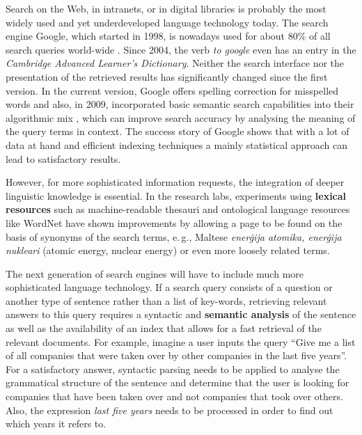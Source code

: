 \begin{multicols}{2}
Search on the Web, in intranets, or in digital libraries is probably the most widely used and yet underdeveloped language technology today. The search engine Google, which started in 1998, is nowadays used for about 80\% of all search queries world-wide \cite{spi1}. Since 2004, the verb \emph{to google} even has an entry in the \emph{Cambridge Advanced Learner’s Dictionary}. Neither the search interface nor the presentation of the retrieved results has significantly changed since the first version. 
In the current version, Google offers spelling correction for misspelled words and also, in 2009, incorporated basic semantic search capabilities into their algorithmic mix \cite{pc1}, which can improve search accuracy by analysing the meaning of the query terms in context. The success story of Google shows that with a lot of data at hand and efficient indexing techniques a mainly statistical approach can lead to satisfactory results.  

However, for more sophisticated information requests, the integration of deeper linguistic knowledge is essential. In the research labs, experiments using \textbf{lexical resources} such as machine-readable thesauri and ontological language resources like WordNet have shown improvements by allowing a page to be found on the basis of synonyms of the search terms, e.\,g., Maltese \emph{enerġija atomika, enerġija nukleari} (atomic energy, nuclear energy) or even more loosely related terms.


The next generation of search engines will have to include much more sophisticated language technology. If a search query consists of a question or another type of sentence rather than a list of key-words, retrieving relevant answers to this query requires a syntactic and \textbf{semantic analysis} of the sentence as well as the availability of an index that allows for a fast retrieval of the relevant documents. For example, imagine a user inputs the query ``Give me a list of all companies that were taken over by other companies in the last five years''. For a satisfactory answer, syntactic parsing needs to be applied to analyse the grammatical structure of the sentence and determine that the user is looking for companies that have been taken over and not companies that took over others. Also, the expression \emph{last five years} needs to be processed in order to find out which years it refers to. 


\end{multicols}

